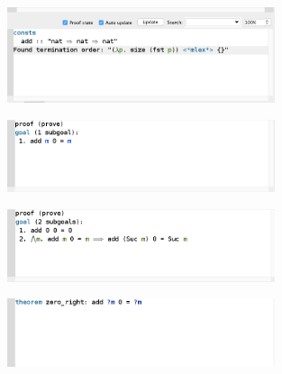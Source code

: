 \documentclass[a4paper]{article}
\begin{document}
	\begin{figure}[ht]
		\centering
		\includegraphics[width=0.7\textwidth, scale=0.7]{2.png}
		\caption*{}
		\label{2}
	\end{figure}
		
	\begin{figure}[ht]
		\centering
		\includegraphics[width=0.7\textwidth, scale=0.7]{3.png}
		\caption*{}
		\label{3}
	\end{figure}
	
	\begin{figure}[ht]
		\centering
		\includegraphics[width=0.7\textwidth, scale=0.7]{4.png}
		\caption*{}
		\label{4}
	\end{figure}
	
	\begin{figure}[ht]
		\centering
		\includegraphics[width=0.7\textwidth, scale=0.7]{5.png}
		\caption*{}
		\label{5}
	\end{figure}
	
	 
\end{document}
